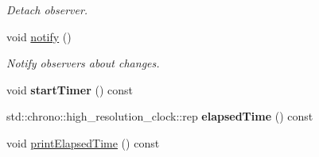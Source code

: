 \begin{DoxyCompactItemize}
\begin{DoxyCompactList}\small\item\em \-Detach observer. \end{DoxyCompactList}\item 
\hypertarget{classSpacy_1_1Mixin_1_1MixinConnection_a1ddeaa78a3bb4a38c2cca36d1f99fe36}{void \hyperlink{classSpacy_1_1Mixin_1_1MixinConnection_a1ddeaa78a3bb4a38c2cca36d1f99fe36}{notify} ()}\label{classSpacy_1_1Mixin_1_1MixinConnection_a1ddeaa78a3bb4a38c2cca36d1f99fe36}

\begin{DoxyCompactList}\small\item\em \-Notify observers about changes. \end{DoxyCompactList}\item 
\hypertarget{classSpacy_1_1Mixin_1_1Timer_acf3c292b6d482c7c4ded5f961be4bc4b}{void {\bfseries start\-Timer} () const}\label{classSpacy_1_1Mixin_1_1Timer_acf3c292b6d482c7c4ded5f961be4bc4b}

\item 
\hypertarget{classSpacy_1_1Mixin_1_1Timer_ab27a20d8e1e9bc90ea56cb18ff752798}{std\-::chrono\-::high\-\_\-resolution\-\_\-clock\-::rep {\bfseries elapsed\-Time} () const}\label{classSpacy_1_1Mixin_1_1Timer_ab27a20d8e1e9bc90ea56cb18ff752798}

\item 
\hypertarget{classSpacy_1_1Mixin_1_1Timer_a3b79b35213702118d0823f6040d5a315}{void \hyperlink{classSpacy_1_1Mixin_1_1Timer_a3b79b35213702118d0823f6040d5a315}{print\-Elapsed\-Time} () const}\label{classSpacy_1_1Mixin_1_1Timer_a3b79b35213702118d0823f6040d5a315}


\end{DoxyCompactItemize}
